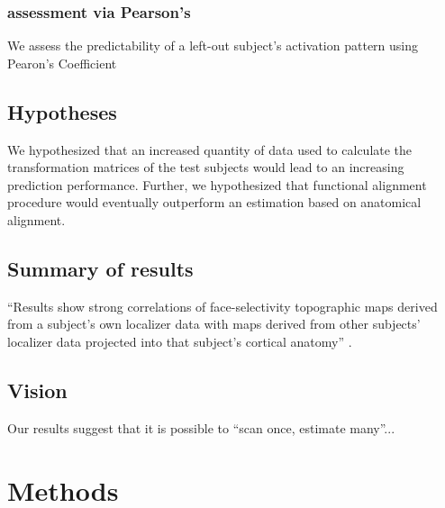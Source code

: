 \subsubsection{assessment via Pearson's}
%
We assess the predictability of a left-out subject's activation pattern using
Pearon's Coefficient


\subsection{Hypotheses}

%
We hypothesized that an increased quantity of data used to calculate the
transformation matrices of the test subjects would lead to an increasing
prediction performance.
%
Further, we hypothesized that functional alignment procedure would eventually
outperform an estimation based on anatomical alignment.


\subsection{Summary of results}


``Results show strong correlations of face-selectivity topographic maps derived
from a subject's own localizer data with maps derived from other subjects'
localizer data projected into that subject's cortical anatomy''
\citep{jiahui2020predicting}.


\subsection{Vision}


Our results suggest that it is possible to ``scan once, estimate many''...



\section{Methods}



